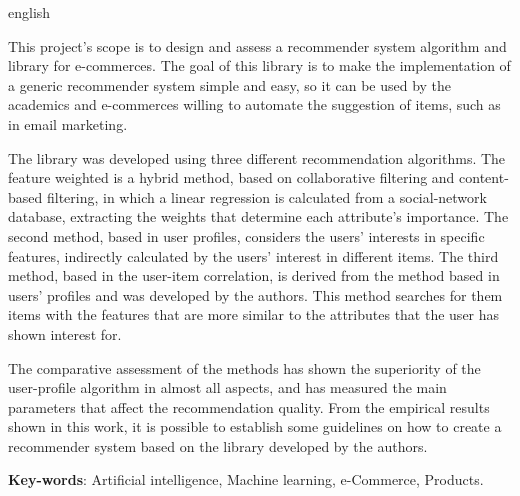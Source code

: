 \setlength{\absparsep}{18pt} %
\begin{resumo}[Abstract]
 \begin{otherlanguage*}{english}

This project's scope is to design and assess a recommender system algorithm and library for e-commerces. The goal of this library is to make the implementation of a generic recommender system simple and easy, so it can be used by the academics and e-commerces willing to automate the suggestion of items, such as in email marketing.

The library was developed using three different recommendation algorithms. The feature weighted is a hybrid method, based on collaborative filtering and content-based filtering, in which a linear regression is calculated from a social-network database, extracting the weights that determine each attribute's importance. The second method, based in user profiles, considers the users' interests in specific features, indirectly calculated by the users' interest in different items. The third method, based in the user-item correlation, is derived from the method based in users' profiles and was developed by the authors. This method searches for them items with the features that are more similar to the attributes that the user has shown interest for.

The comparative assessment of the methods has shown the superiority of the user-profile algorithm in almost all aspects, and has measured the main parameters that affect the recommendation quality. From the empirical results shown in this work, it is possible to establish some guidelines on how to create a recommender system based on the library developed by the authors.

   \vspace{\onelineskip}
 
   \noindent 
   \textbf{Key-words}: Artificial intelligence, Machine learning, e-Commerce, Products.
 \end{otherlanguage*}
\end{resumo}
